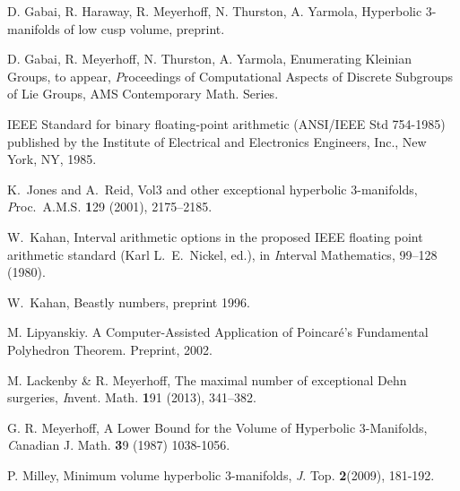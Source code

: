 \begin{thebibliography}{GHMTY}


 D. Gabai, R. Haraway, R. Meyerhoff, N. Thurston, A. Yarmola, Hyperbolic 3-manifolds of low cusp volume, preprint.

 D. Gabai,  R. Meyerhoff, N. Thurston, A. Yarmola, Enumerating Kleinian Groups, to appear, {\textit Proceedings of  Computational Aspects of Discrete Subgroups of Lie Groups, AMS Contemporary Math. Series.}

 IEEE Standard for binary floating-point arithmetic
(ANSI/IEEE Std 754-1985) published by the Institute of 
Electrical and Electronics Engineers, Inc., New York, NY, 1985.
 
 
% 
  K.\ Jones and A.\ Reid, Vol3 and other exceptional 
hyperbolic $3$-manifolds,  {\textit Proc.\ A.M.S.} {\textbf 129}
(2001), 2175--2185.
 
   W.\ Kahan, Interval arithmetic options in the 
proposed IEEE floating point arithmetic standard (Karl L.\ E.\ Nickel,
ed.), in  
{\textit Interval Mathematics\/}, 99--128 (1980). 
 
   W.\ Kahan, Beastly numbers, preprint 1996.


 M. Lipyanskiy. A Computer-Assisted Application
of Poincar\'e's Fundamental Polyhedron Theorem.
Preprint, 2002.

 M. Lackenby \& R. Meyerhoff, The maximal number of exceptional Dehn surgeries, {\textit Invent. Math.} {\textbf 191} (2013), 341--382.


G. R. Meyerhoff, A Lower Bound for the Volume of Hyperbolic 
3-Manifolds, {\textit Canadian J. Math.} {\textbf 39} (1987) 1038-1056.


 P. Milley, Minimum volume hyperbolic 3-manifolds, {\textit J. Top.} {\textbf 2}(2009), 181-192.


\end{thebibliography}
